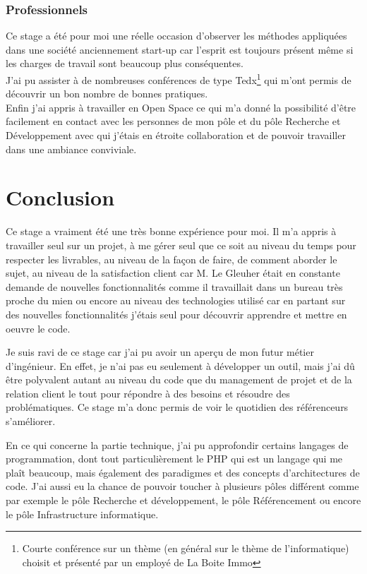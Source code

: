 \documentclass[12pt]{article}
\begin{document}
\subsubsection{Professionnels}
Ce stage a été pour moi une réelle occasion d'observer les méthodes appliquées dans une société anciennement start-up car l'esprit est toujours présent même si les charges de travail sont beaucoup plus conséquentes.\\
J'ai pu assister à de nombreuses conférences de type Tedx\footnote{Courte conférence sur un thème (en général sur le thème de l'informatique) choisit et présenté par un employé de La Boite Immo} qui m'ont permis de découvrir un bon nombre de bonnes pratiques. \\
Enfin j'ai appris à travailler en Open Space ce qui m'a donné la possibilité d'être facilement en contact avec les personnes de mon pôle et du pôle Recherche et Développement avec qui j'étais en étroite collaboration et de pouvoir travailler dans une ambiance conviviale.
\newpage

\setcounter{secnumdepth}{0}
\section{Conclusion}
Ce stage a vraiment été une très bonne expérience pour moi. Il m'a appris à travailler seul sur un projet, à me gérer seul que ce soit au niveau du temps pour respecter les livrables, au niveau de la façon de faire, de comment aborder le sujet, au niveau de la satisfaction client car  M. Le Gleuher était en constante demande de nouvelles fonctionnalités comme il travaillait dans un bureau très proche du mien ou encore au niveau des technologies utilisé car en partant sur des nouvelles fonctionnalités j'étais seul pour découvrir apprendre et mettre en oeuvre le code.

Je suis ravi de ce stage car j'ai pu avoir un aperçu de mon futur métier d'ingénieur. En effet, je n'ai pas eu seulement à développer un outil, mais j'ai dû être polyvalent autant au niveau du code que du management de projet et de la relation client le tout pour répondre à des besoins et résoudre des problématiques. Ce stage m'a donc permis de voir le quotidien des référenceurs s'améliorer.

En ce qui concerne la partie technique, j'ai pu approfondir certains langages de programmation, dont tout particulièrement le PHP qui est un langage qui me plaît beaucoup, mais également des paradigmes et des concepts d'architectures de code.\newline
J'ai aussi eu la chance de pouvoir toucher à plusieurs pôles différent comme par exemple le pôle Recherche et développement, le pôle Référencement ou encore le pôle Infrastructure informatique.
\end{document}
